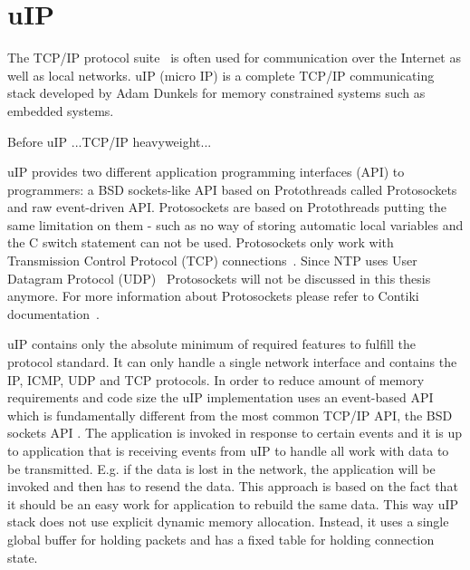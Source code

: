 
\section{uIP}\label{sec:contiki-uip}
The TCP/IP protocol suite~\cite{rfc1180} is often used for communication over the Internet as well as local networks.
uIP (micro IP) is a complete TCP/IP communicating stack developed by Adam Dunkels
for memory constrained systems such as embedded systems.

Before uIP ...TCP/IP heavyweight...
\!

uIP provides two different application programming interfaces (API) to programmers:
a BSD sockets-like API based on Protothreads called Protosockets and raw event-driven API.
Protosockets are based on Protothreads putting the same limitation on them - such as 
no way of storing automatic local variables and the C switch statement can not be used.
Protosockets only work with Transmission Control Protocol (TCP) connections~\cite{rfc793, contiki-docs}.
Since NTP uses User Datagram Protocol (UDP)~\cite{rfc768} Protosockets will not be
discussed in this thesis anymore. For more information about Protosockets
please refer to Contiki documentation~\cite{contiki-docs}.

uIP contains only the absolute minimum of required features to fulfill the protocol standard.
It can only handle a single network interface and contains the IP, ICMP, UDP and TCP protocols.
In order to reduce amount of memory requirements and code size the
uIP implementation uses an event-based API which is fundamentally different
from the most common TCP/IP API, the BSD sockets API \cite{thesis-programming}.
The application is invoked in response to certain events and
it is up to application that is receiving events from uIP to handle all
work with data to be transmitted. E.g. if the data is lost in the network,
the application will be invoked and then has to resend the data.
This approach is based on the fact that it should be an easy work for application
to rebuild the same data.
This way uIP stack does not use explicit dynamic memory allocation.
Instead, it uses a single global buffer for holding packets and has a fixed
table for holding connection state.


